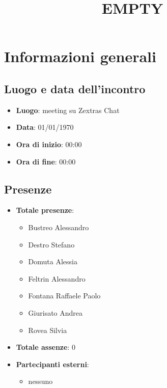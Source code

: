 \documentclass[12pt]{article}
\title{EMPTY}
\begin{document}
	\makefirstpage
	
	
	\clearpage
	
	\tableofcontents
	\clearpage

    \section{Informazioni generali}
    
    \subsection{Luogo e data dell'incontro}
    
    \begin{itemize}
    	\item \textbf{Luogo}: meeting su Zextras Chat
    	\item \textbf{Data}: 01/01/1970
    	\item \textbf{Ora di inizio}: 00:00
    	\item \textbf{Ora di fine}: 00:00
    \end{itemize}
    
    \subsection{Presenze}
    
    \begin{itemize}
    	\item \textbf{Totale presenze}:
    	\begin{itemize}
    		\item Bustreo Alessandro
    		\item Destro Stefano
    		\item Domuta Alessia 
    		\item Feltrin Alessandro 
    		\item Fontana Raffaele Paolo 
    		\item Giurisato Andrea 
    		\item Rovea Silvia
    	\end{itemize}
    	
    	\item \textbf{Totale assenze}: 0
    	
    	\item \textbf{Partecipanti esterni}:
    	\begin{itemize}
    		\item nessuno
    	\end{itemize}
    \end{itemize}
    
\end{document}
